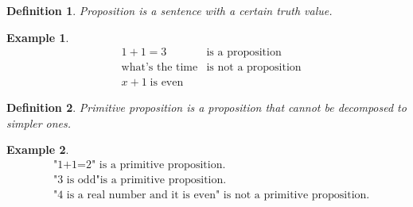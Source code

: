 \documentclass{article}
\newtheorem{definition}{Definition}
\newtheorem{ex}{Example}
\begin{document}
\begin{definition}
	Proposition is a sentence with a certain truth value.
\end{definition}
\begin{ex}
	\begin{align*}
	&1+1=3 &\text{is a proposition}\\
	&\text{what's the time} &\text{is not a proposition}\\
	&x+1\;\text{is even}
	\end{align*}
\end{ex}

\begin{definition}
	Primitive proposition is a proposition that cannot be decomposed to simpler ones.
\end{definition}
\begin{ex}
	\begin{align*}
	&\text{"1+1=2" is a primitive proposition.}\\
	&\text{"3 is odd"is a primitive proposition.}\\
	&\text{"4 is a real number and it is even" is not a primitive proposition.} 
	\end{align*}
\end{ex}
\end{document}
